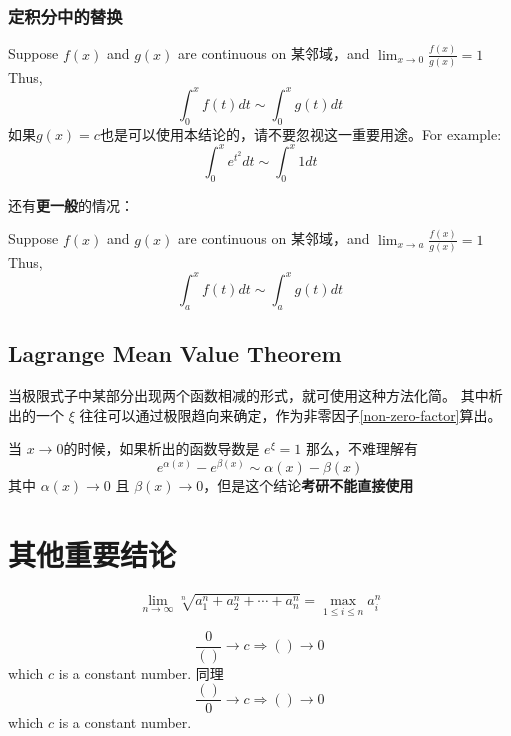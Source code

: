 \subsubsection{定积分中的替换}
Suppose $f(x)$ and $g(x)$ are continuous on 某邻域，and $\lim_{x \to 0} \frac{f(x)}{g(x)} = 1$
Thus, 
\begin{equation}
	\int_0^{x} f(t) dt \sim \int_0^{x} g(t) dt
\end{equation}
如果$g(x)=c$也是可以使用本结论的，请不要忽视这一重要用途。For example:
\[
\int_0^x e^{t^2} dt \sim \int_0^{x} 1 dt
\]

还有\textbf{更一般}的情况：
\begin{lemma}
	Suppose $f(x)$ and $g(x)$ are continuous on 某邻域，and $\lim_{x \to a} \frac{f(x)}{g(x)} = 1$ 
	Thus, 
	\begin{equation}
		\int_a^{x} f(t) dt \sim \int_a^{x} g(t) dt
	\end{equation}
\end{lemma}

\subsection{Lagrange Mean Value Theorem} \label{lagrange-limit}
当极限式子中某部分出现两个函数相减的形式，就可使用这种方法化简。
其中析出的一个 $\xi$ 往往可以通过极限趋向来确定，作为非零因子\ref{non-zero-factor}算出。

当 $x\to0$的时候，如果析出的函数导数是 $e^{\xi} = 1$ 那么，不难理解有
\begin{equation}
	e^{\alpha(x)} - e^{\beta(x)} \sim \alpha(x) - \beta(x)
\end{equation}
其中 $\alpha(x) \to 0$ 且 $\beta(x) \to 0$，但是这个结论\textbf{考研不能直接使用}

\section{其他重要结论}
\begin{lemma}
	\begin{equation}
		\lim_{n \to \infty} \sqrt[n]{a^{n}_{1} + a^{n}_{2} + 
			\cdots + a^{n}_{n}} = \max_{1\leq i \leq n}{a_{i}^{n}}
	\end{equation}
\end{lemma}

\begin{lemma}
    \begin{equation}
        \frac{0}{()} \to c \Rightarrow () \to 0
    \end{equation}
    which $c$ is a constant number.
    同理
    \begin{equation}
        \frac{()}{0} \to c \Rightarrow () \to 0
    \end{equation}
    which $c$ is a constant number.
\end{lemma}

